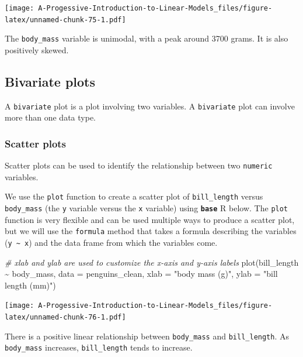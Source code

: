 \documentclass[
]{book}
\newenvironment{Shaded}{\begin{snugshade}}{\end{snugshade}}
\newcommand{\AttributeTok}[1]{\textcolor[rgb]{0.77,0.63,0.00}{#1}}
\newcommand{\CommentTok}[1]{\textcolor[rgb]{0.56,0.35,0.01}{\textit{#1}}}
\newcommand{\FunctionTok}[1]{\textcolor[rgb]{0.00,0.00,0.00}{#1}}
\newcommand{\NormalTok}[1]{#1}
\newcommand{\SpecialCharTok}[1]{\textcolor[rgb]{0.00,0.00,0.00}{#1}}
\newcommand{\StringTok}[1]{\textcolor[rgb]{0.31,0.60,0.02}{#1}}
\theoremstyle{definition}
\theoremstyle{definition}
\theoremstyle{definition}
\theoremstyle{definition}
\theoremstyle{remark}
\begin{document}
\texttt{[image: A-Progessive-Introduction-to-Linear-Models\_files/figure-latex/unnamed-chunk-75-1.pdf]}

The \texttt{body\_mass} variable is unimodal, with a peak around 3700 grams. It is also positively skewed.

\hypertarget{bivariate-plots}{%
\subsection{Bivariate plots}\label{bivariate-plots}}

A \texttt{bivariate} plot is a plot involving two variables. A \texttt{bivariate} plot can involve more than one data type.

\hypertarget{scatter-plots}{%
\subsubsection{Scatter plots}\label{scatter-plots}}

Scatter plots can be used to identify the relationship between two \texttt{numeric} variables.

We use the \texttt{plot} function to create a scatter plot of \texttt{bill\_length} versus \texttt{body\_mass} (the \texttt{y} variable versus the \texttt{x} variable) using \textbf{\texttt{base}} R below. The \texttt{plot} function is very flexible and can be used multiple ways to produce a scatter plot, but we will use the \texttt{formula} method that takes a formula describing the variables (\texttt{y\ \textasciitilde{}\ x}) and the data frame from which the variables come.

\begin{Shaded}
\begin{Highlighting}[]
\CommentTok{\# xlab and ylab are used to customize the x{-}axis and y{-}axis labels}
\FunctionTok{plot}\NormalTok{(bill\_length }\SpecialCharTok{\textasciitilde{}}\NormalTok{ body\_mass, }\AttributeTok{data =}\NormalTok{ penguins\_clean,}
     \AttributeTok{xlab =} \StringTok{"body mass (g)"}\NormalTok{, }\AttributeTok{ylab =} \StringTok{"bill length (mm)"}\NormalTok{)}
\end{Highlighting}
\end{Shaded}

\texttt{[image: A-Progessive-Introduction-to-Linear-Models\_files/figure-latex/unnamed-chunk-76-1.pdf]}

There is a positive linear relationship between \texttt{body\_mass} and \texttt{bill\_length}. As \texttt{body\_mass} increases, \texttt{bill\_length} tends to increase.
\end{document}
